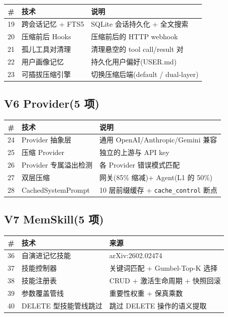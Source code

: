 \documentclass[11pt,a4paper]{article}
\begin{document}
\begin{longtable}{@{}clp{8cm}@{}}
  \toprule
  \# & 技术 & 说明 \\
  \midrule
  19 & 跨会话记忆 + FTS5 & SQLite 会话持久化 + 全文搜索 \\
  20 & 压缩前后 Hooks & 压缩前后的 HTTP webhook \\
  21 & 孤儿工具对清理 & 清理悬空的 tool call/result 对 \\
  22 & 用户画像记忆 & 持久化用户偏好(USER.md) \\
  23 & 可插拔压缩引擎 & 切换压缩后端(default / dual-layer) \\
  \bottomrule
\end{longtable}

\subsection{V6 Provider(5 项)}

\begin{longtable}{@{}clp{8cm}@{}}
  \toprule
  \# & 技术 & 说明 \\
  \midrule
  24 & Provider 抽象层 & 通用 OpenAI/Anthropic/Gemini 兼容 \\
  25 & 压缩 Provider & 独立的上游与 API key \\
  26 & Provider 专属溢出检测 & 各 Provider 错误模式匹配 \\
  27 & 双层压缩 & 网关(85\% 缩减)+ Agent(L1 的 50\%) \\
  28 & CachedSystemPrompt & 10 层前缀缓存 + \texttt{cache\_control} 断点 \\
  \bottomrule
\end{longtable}

\subsection{V7 MemSkill(5 项)}

\begin{longtable}{@{}clp{8cm}@{}}
  \toprule
  \# & 技术 & 来源 \\
  \midrule
  36 & 自演进记忆技能 & arXiv:2602.02474 \\
  37 & 技能控制器 & 关键词匹配 + Gumbel-Top-K 选择 \\
  38 & 技能注册表 & CRUD + 激活生命周期 + 快照回滚 \\
  39 & 参数覆盖管线 & 重要性权重 + 保真乘数 \\
  40 & DELETE 型技能管线跳过 & 跳过 DELETE 操作的语义提取 \\
  \bottomrule
\end{longtable}
\end{document}
